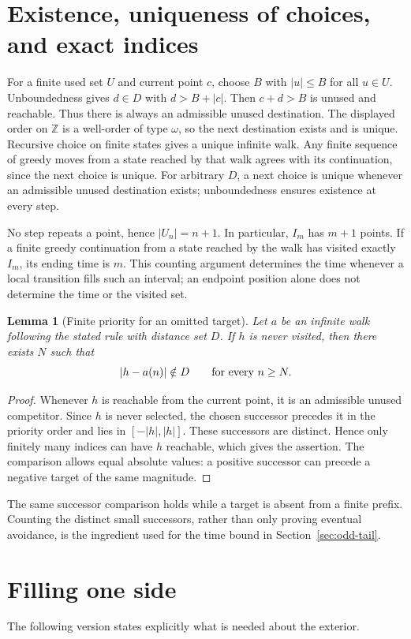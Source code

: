 \documentclass[11pt,a4paper]{article}
\newtheorem{lemma}[theorem]{Lemma}
\newcommand{\Z}{\mathbb Z}\newcommand{\N}{\mathbb N}
\begin{document}
\section{Existence, uniqueness of choices, and exact indices}
For a finite used set $U$ and current point $c$, choose $B$ with
$|u|\le B$ for all $u\in U$. Unboundedness gives $d\in D$ with
$d>B+|c|$. Then $c+d>B$ is unused and reachable. Thus there is always an
admissible unused destination. The displayed order on $\Z$ is a well-order
of type $\omega$, so the next destination exists and is unique.
Recursive choice on finite states gives a unique infinite walk. Any finite
sequence of greedy moves from a state reached by that walk agrees with its
continuation, since the next choice is unique. For arbitrary $D$, a next
choice is unique whenever an admissible unused destination exists;
unboundedness ensures existence at every step.

No step repeats a point, hence $|U_n|=n+1$. In particular, $I_m$ has $m+1$
points. If a finite greedy continuation from a state reached by the walk
has visited exactly $I_m$, its ending time is $m$. This counting argument
determines the time whenever a local transition fills such an interval;
an endpoint position alone
does not determine the time or the visited set.

\begin{lemma}[Finite priority for an omitted target]\label{lem:finite-priority}
Let $a$ be an infinite walk following the stated rule with distance set $D$.
If $h$ is never visited, then there exists $N$ such that
\[
 |h-a(n)|\notin D\qquad\hbox{for every }n\ge N.
\]
\end{lemma}
\begin{proof}
Whenever $h$ is reachable from the current point, it is an admissible unused
competitor. Since $h$ is never selected, the chosen successor precedes it
in the priority order and lies in $[-|h|,|h|]$. These successors are
distinct. Hence only finitely many indices can have $h$ reachable, which
gives the assertion. The comparison allows equal absolute values: a
positive successor can precede a negative target of the same magnitude.
\end{proof}

The same successor comparison holds while a target is absent from a finite
prefix. Counting the distinct small successors, rather than only proving
eventual avoidance, is the ingredient used for the time bound in
Section~\ref{sec:odd-tail}.

\section{Filling one side}\label{sec:filling}
The following version states explicitly what is needed about the exterior.
\end{document}
